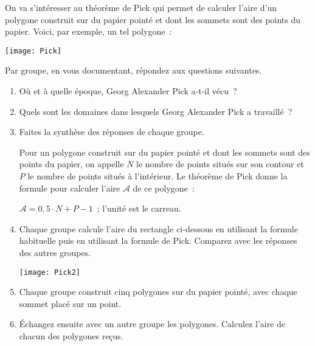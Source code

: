 
\begin{TP}

On va s'intéresser au théorème de Pick qui permet de calculer l'aire d'un polygone construit sur du papier pointé et dont les sommets sont des points du papier. Voici, par exemple, un tel polygone :
\begin{center} \texttt{[image: Pick]} \end{center}

Par groupe, en vous documentant, répondez aux questions suivantes.
\begin{enumerate}
 \item Où et à quelle époque, Georg Alexander Pick a‑t‑il vécu ?
 \item Quels sont les domaines dans lesquels Georg Alexander Pick a travaillé ?
 \item Faites la synthèse des réponses de chaque groupe.


Pour un polygone construit sur du papier pointé et dont les sommets sont des points du papier, on appelle $N$ le nombre de points situés sur son contour et $P$ le nombre de points situés à l'intérieur. Le théorème de Pick donne la formule pour calculer l'aire $\mathcal{A}$ de ce polygone :
\begin{center} $\mathcal{A} = 0,5 \cdot N + P - 1$ ; l'unité est le carreau. \end{center}
\vspace{0.5cm}
 \item Chaque groupe calcule l'aire du rectangle ci‑dessous en utilisant la formule habituelle puis en utilisant la formule de Pick. Comparez avec les réponses des autres groupes. \\[1em]
\begin{center} \texttt{[image: Pick2]} \end{center}

 \item Chaque groupe construit cinq polygones sur du papier pointé, avec chaque sommet placé sur un point.
 \item Échangez ensuite avec un autre groupe les polygones. Calculez l'aire de chacun des polygones reçus.
 \end{enumerate}
\end{TP}


